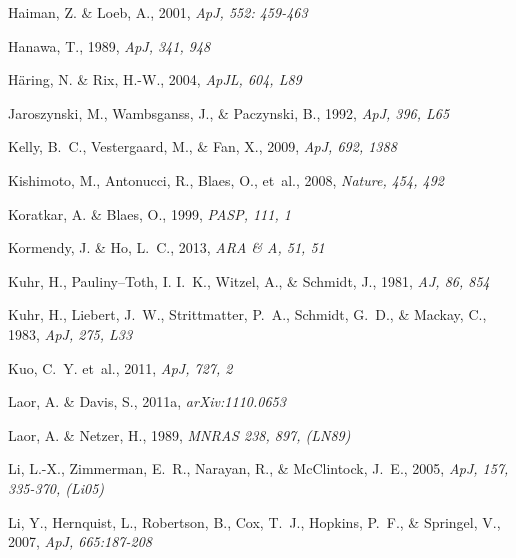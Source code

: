 \documentclass{aa}
\begin{document}
\begin{thebibliography}{}
Haiman, Z. \& Loeb, A., 2001,
\newblock \emph{ApJ, 552: 459-463}

Hanawa, T., 1989,
\newblock \emph{ApJ, 341, 948}

H{\"a}ring, N. \& Rix, H.-W., 2004,
\newblock \emph{ApJL, 604, L89}

Jaroszynski, M., Wambsganss, J., \& Paczynski, B., 1992,
\newblock \emph{ApJ, 396, L65}

Kelly, B.~C., Vestergaard, M., \& Fan, X., 2009,
\newblock \emph{ApJ, 692, 1388}

Kishimoto, M., Antonucci, R., Blaes, O., et~al., 2008,
\newblock \emph{Nature, 454, 492}

Koratkar, A. \& Blaes, O., 1999,
\newblock \emph{PASP, 111, 1}

Kormendy, J. \& Ho, L.~C., 2013,
\newblock \emph{ARA \& A, 51, 51}

Kuhr, H., Pauliny–Toth, I. I.~K., Witzel, A., \& Schmidt, J., 1981,
\newblock \emph{AJ, 86, 854}

Kuhr, H., Liebert, J.~W., Strittmatter, P.~A., Schmidt, G.~D., \& Mackay, C., 1983,
\newblock \emph{ApJ, 275, L33}

Kuo, C.~Y. et~al., 2011,
\newblock \emph{ApJ, 727, 2}

Laor, A. \& Davis, S., 2011a,
\newblock \emph{arXiv:1110.0653}

Laor, A. \& Netzer, H., 1989,
\newblock \emph{MNRAS 238, 897, (LN89)}

Li, L.-X., Zimmerman, E.~R., Narayan, R., \& McClintock, J.~E., 2005,
\newblock \emph{ApJ, 157, 335-370, (Li05)}

Li, Y., Hernquist, L., Robertson, B., Cox, T.~J., Hopkins, P.~F., \& Springel,
  V., 2007,
\newblock \emph{ApJ, 665:187-208}


\end{thebibliography}
\end{document}
